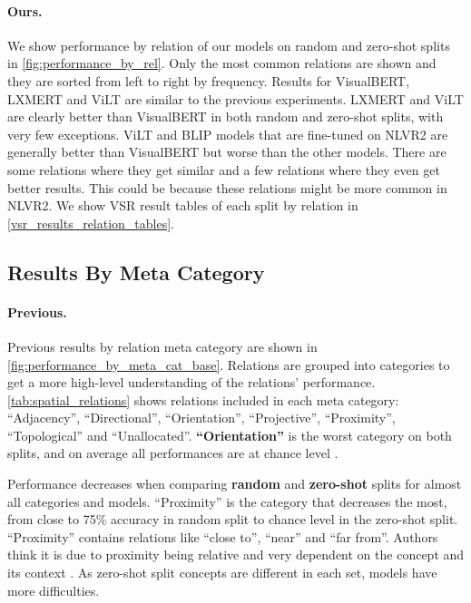 \paragraph{Ours.}
We show performance by relation of our models on random and zero-shot splits in \cref{fig:performance_by_rel}. Only the most common relations are shown and they are sorted from left to right by frequency. Results for VisualBERT, LXMERT and ViLT are similar to the previous experiments. LXMERT and ViLT are clearly better than VisualBERT in both random and zero-shot splits, with very few exceptions. ViLT and BLIP models that are fine-tuned on NLVR2 are generally better than VisualBERT but worse than the other models. There are some relations where they get similar and a few relations where they even get better results. This could be because these relations might be more common in NLVR2. We show VSR result tables of each split by relation in \cref{vsr_results_relation_tables}.

\subsection{Results By Meta Category} \label{vsr_results_meta}

\paragraph{Previous.}

Previous results by relation meta category are shown in \cref{fig:performance_by_meta_cat_base}. Relations are grouped into categories to get a more high-level understanding of the relations' performance. \cref{tab:spatial_relations} shows relations included in each meta category: ``Adjacency'', ``Directional'', ``Orientation'', ``Projective'', ``Proximity'', ``Topological'' and ``Unallocated''. \textbf{``Orientation''} is the worst category on both splits, and on average all performances are at chance level \cite{liu2022visual}.

Performance decreases when comparing \textbf{random} and \textbf{zero-shot} splits for almost all categories and models. ``Proximity'' is the category that decreases the most, from close to 75\% accuracy in random split to chance level in the zero-shot split. ``Proximity'' contains relations like ``close to'', ``near'' and ``far from''. Authors think it is due to proximity being relative and very dependent on the concept and its context \cite{liu2022visual}. As zero-shot split concepts are different in each set, models have more difficulties.

